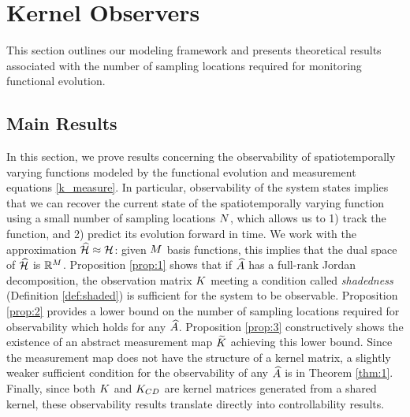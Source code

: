 \vspace{-0.1in}
\section{Kernel Observers}\label{sec:observers}

This section outlines our modeling framework and presents theoretical results associated with the number of sampling locations required for monitoring functional evolution. 

\vspace{-0.1in}




\subsection{Main Results}\label{sec:theory_results}
In this section, we prove results concerning the observability of spatiotemporally varying functions modeled by the functional evolution and measurement equations \eqref{k_measure}. In particular,  observability of the system states implies that we can recover the current state of the spatiotemporally varying function using a small number of sampling locations $N$, which allows us to 1) track the function, and 2) predict its evolution forward in time. We work with the approximation $\widehat{\mathcal{H}}\approx\mathcal{H}$: given $M$ basis functions, this implies that the dual space of $\widehat{\mathcal{H}}$ is $\mathbb{R}^{M}$.
Proposition \ref{prop:1} shows that if $\widehat{A}$ has a full-rank Jordan decomposition, the observation matrix $K$ meeting a condition called \emph{shadedness} (Definition \ref{def:shaded}) is sufficient for the system to be observable. Proposition \ref{prop:2} provides a lower bound on the number of sampling locations required for observability which holds for any $\widehat{A}$.  Proposition \ref{prop:3} constructively shows the existence of an abstract measurement map $\widetilde{K}$ achieving this lower bound. Since the measurement map does not have the structure of a kernel matrix, a slightly weaker sufficient condition for the observability of any $\widehat{A}$ is in Theorem \ref{thm:1}. Finally, since both $K$ and $K_{CD}$ are kernel matrices generated from a shared kernel, these observability results translate directly into controllability results. %

